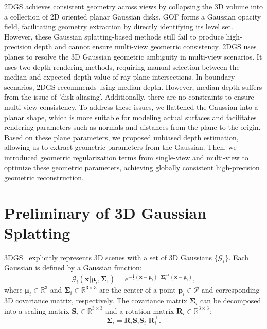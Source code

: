 \documentclass[lettersize,journal]{IEEEtran}
\begin{document}
2DGS achieves consistent geometry across views by collapsing the 3D volume into a collection of 2D oriented planar Gaussian disks. GOF forms a Gaussian opacity field, facilitating geometry extraction by directly identifying its level set. \textcolor{r}{However, these Gaussian splatting-based methods still fail to produce high-precision depth and cannot ensure multi-view geometric consistency. 2DGS uses planes to resolve the 3D Gaussian geometric ambiguity in multi-view scenarios. It uses two depth rendering methods, requiring manual selection between the median and expected depth value of ray-plane intersections. In boundary scenarios, 2DGS recommends using median depth. However, median depth suffers from the issue of 'disk-aliasing'. Additionally, there are no constraints to ensure multi-view consistency.} To address these issues, we flattened the Gaussian into a planar shape, which is more suitable for modeling actual surfaces and facilitates rendering parameters such as normals and distances from the plane to the origin. Based on these plane parameters, we proposed unbiased depth estimation, allowing us to extract geometric parameters from the Gaussian. Then, we introduced geometric regularization terms from single-view and multi-view to optimize these geometric parameters, achieving globally consistent high-precision geometric reconstruction.

\section{Preliminary of 3D Gaussian Splatting}
3DGS~\cite{kerbl20233d} explicitly represents 3D scenes with a set of 3D Gaussians $\{\mathcal G_i\}$. Each Gaussian is defined by a Gaussian function:
$$
\mathcal G_i(\bm{x}|\bm{\mu}_i, \bm{\Sigma_i}) = e^{-\frac{1}{2}(\bm{x} - \bm{\mu}_i)^\top\bm{\Sigma}_i^{-1}(\bm{x}-\bm{\mu}_i)},
$$
where $\bm{\mu}_i \in \mathbb R^3$ and $\bm{\Sigma}_i \in \mathbb R^{3\times3}$ are the center of a point $\bm{p}_i\in \mathcal P$ and corresponding 3D covariance matrix, respectively. The covariance matrix $\bm{\Sigma}_i$ can be decomposed into a scaling matrix $\bm{S}_i\in \mathbb R^{3\times3}$ and a rotation matrix $\bm{R}_i\in \mathbb R^{3\times3}$:
$$
\bm{\Sigma}_i = \bm{R}_i\bm{S}_i\bm{S}_i^\top \bm{R}_i^\top.
$$
\end{document}
